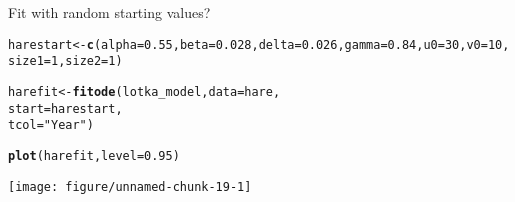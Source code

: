 \documentclass{article}\usepackage[]{graphicx}\usepackage[]{color}
\makeatletter
\def\maxwidth{ %
  \ifdim\Gin@nat@width>\linewidth
    \linewidth
  \else
    \Gin@nat@width
  \fi
}
\newcommand{\hlnum}[1]{\textcolor[rgb]{0.686,0.059,0.569}{#1}}%
\newcommand{\hlstr}[1]{\textcolor[rgb]{0.192,0.494,0.8}{#1}}%
\newcommand{\hlstd}[1]{\textcolor[rgb]{0.345,0.345,0.345}{#1}}%
\newcommand{\hlkwb}[1]{\textcolor[rgb]{0.69,0.353,0.396}{#1}}%
\newcommand{\hlkwc}[1]{\textcolor[rgb]{0.333,0.667,0.333}{#1}}%
\newcommand{\hlkwd}[1]{\textcolor[rgb]{0.737,0.353,0.396}{\textbf{#1}}}%
\newenvironment{kframe}{%
 \def\at@end@of@kframe{}%
 \ifinner\ifhmode%
  \def\at@end@of@kframe{\end{minipage}}%
  \begin{minipage}{\columnwidth}%
 \fi\fi%
 \def\FrameCommand##1{\hskip\@totalleftmargin \hskip-\fboxsep
 \colorbox{shadecolor}{##1}\hskip-\fboxsep
     \hskip-\linewidth \hskip-\@totalleftmargin \hskip\columnwidth}%
 \MakeFramed {\advance\hsize-\width
   \@totalleftmargin\z@ \linewidth\hsize
   \@setminipage}}%
 {\par\unskip\endMakeFramed%
 \at@end@of@kframe}
\newenvironment{knitrout}{}{} %
\makeatother
\begin{document}
Fit with random starting values?
\begin{knitrout}
\color{fgcolor}\begin{kframe}
\begin{alltt}
\hlstd{harestart} \hlkwb{<-} \hlkwd{c}\hlstd{(}\hlkwc{alpha}\hlstd{=}\hlnum{0.55}\hlstd{,} \hlkwc{beta}\hlstd{=}\hlnum{0.028}\hlstd{,} \hlkwc{delta}\hlstd{=}\hlnum{0.026}\hlstd{,} \hlkwc{gamma}\hlstd{=}\hlnum{0.84}\hlstd{,} \hlkwc{u0}\hlstd{=}\hlnum{30}\hlstd{,} \hlkwc{v0}\hlstd{=}\hlnum{10}\hlstd{,}
               \hlkwc{size1}\hlstd{=}\hlnum{1}\hlstd{,} \hlkwc{size2}\hlstd{=}\hlnum{1}\hlstd{)}

\hlstd{harefit} \hlkwb{<-} \hlkwd{fitode}\hlstd{(lotka_model,} \hlkwc{data}\hlstd{=hare,}
                  \hlkwc{start}\hlstd{=harestart,}
                  \hlkwc{tcol}\hlstd{=}\hlstr{"Year"}\hlstd{)}
\end{alltt}


{\ttfamily\noindent\itshape\color{messagecolor}{\#\# Fitting ode ...}}

{\ttfamily\noindent\itshape\color{messagecolor}{\#\# Computing vcov on the original scale ...}}\begin{alltt}
\hlkwd{plot}\hlstd{(harefit,} \hlkwc{level}\hlstd{=}\hlnum{0.95}\hlstd{)}
\end{alltt}
\end{kframe}
\texttt{[image: figure/unnamed-chunk-19-1]} 

\end{knitrout}
\end{document}
